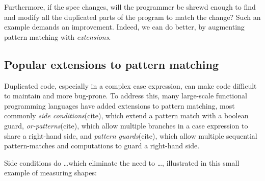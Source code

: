 \documentclass[manuscript,screen,12pt, nonacm]{acmart}
\begin{document}
    Furthermore, if the spec changes, will the programmer be shrewd enough to
    find and modify all the duplicated parts of the program to match the change?
    Such an example demands an improvement. Indeed, we can do better, by 
    augmenting pattern matching with \textit{extensions}. 


    \subsection{Popular extensions to pattern matching}
    \label{extensions}

    


    Duplicated code, especially in a complex case expression, can make code
    difficult to maintain and more bug-prone. To address this, many large-scale
    functional programming languages have added extensions to pattern matching,
    most commonly \textit{side conditions}(cite), which extend a pattern match with a
    boolean guard, \textit{or-patterns}(cite), which allow multiple branches in a case
    expression to share a right-hand side, and \textit{pattern guards}(cite), which
    allow multiple sequential pattern-matches and computations to guard a
    right-hand side. 

    Side conditions do \dots which eliminate the need to \dots, 
    illustrated in this small example of measuring shapes: 

\end{document}
